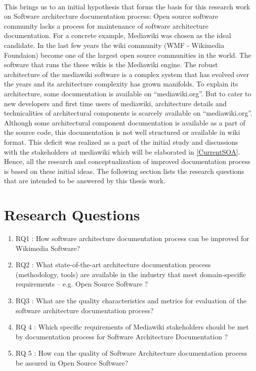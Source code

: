 \\\indent This brings us to an initial hypothesis that forms the basis for this research work on Software architecture documentation process: Open source software community lacks a process for maintenance of software architecture documentation. 
For a concrete example, Mediawiki was chosen as the ideal candidate. In the last few years the wiki community (WMF - Wikimedia Foundaion) become one of the largest open source communities in the world. The software that runs the these wikis is the Mediawiki engine. The robust architecture of the mediawiki software is a complex system that has evolved over the years and its architecture complexity has grown manifolds. To explain its architecture, some documentation is available on “mediawiki.org”. But to cater to new developers and first time users of mediawiki, architecture details and technicalities of architectural components is scarcely available on “mediawiki.org”. Although some architectural component documentation is available as a part of the source code, this documentation is not well structured or available in wiki format. This deficit was realized as a part of the initial study and discussions with the stakeholders at mediawiki which will be elaborated in \autoref{CurrentSOA}. Hence, all the research and conceptualization of improved documentation process is based on these initial ideas. The following section lists the research questions that are intended to be answered by this thesis work.

\section{Research Questions}
\begin{enumerate}
\item RQ1\label{RQ1}  : How software architecture documentation process can be improved for Wikimedia Software?
\item RQ2\label{RQ2} : What state-of-the-art architecture documentation process (methodology, tools) are available in the industry that meet domain-specific requirements – e.g. Open Source Software ?
\item RQ3\label{RQ3} : What are the quality characteristics and metrics for evaluation of the software architecture documentation process?
\item RQ 4\label{RQ4} : Which specific requirements of Mediawiki stakeholders should be met by documentation process for Software Architecture Documentation ?
\item RQ 5\label{RQ5} : How can the quality of Software Architecture documentation process be assured in Open Source Software?
\end{enumerate}

